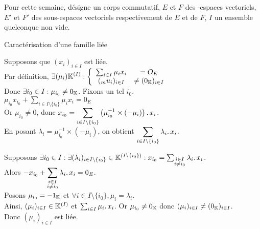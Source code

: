 \documentclass{article}
\date{24 Mars 2024}
\begin{document}
	\maketitle

	Pour cette semaine, \K désigne un corps commutatif, $E$ et $F$ des \K\!\!-espaces vectoriels, $E'$ et $F'$ des sous-espaces vectoriels respectivement de $E$ et de $F$, $I$ un ensemble quelconque non vide.

	\begin{question_kholle}
		[Une famille est liée si et seulement si l'un de ses vecteurs est une combinaison linéaires d'autres vecteurs de la famille.
		\begin{equation}
			(x_i)_{i \in I} \text{ est liée}
			\iff \exists i_0 \in I : \exists (\lambda_i)_{i \in I\setminus\{i_0\}} \in \K^{\left( I \setminus \{i_0\} \right)} :
			x_{i_0} = \sum_{\substack{i \in I \\ i \neq i_0}} \lambda_i \ldotp x_i
		\end{equation}]
		{Caractérisation d'une famille liée}

		Supposons que $(x_i)_{i \in I}$ est liée. \\
		Par définition, $\displaystyle \exists (\mu_i) \mathbb K^{(I)} :
		\left\{ \begin{array}{ccc}
			\sum_{i \in I} \mu_i x_i &= O_E \\
			(_mu_i)_{i \in I} &\neq (0_{\mathbb K})_{i \in I}
		\end{array} \right.$ \\
		Donc $\exists i_0 \in I : \mu_{i_0} \neq 0_{\mathbb K}$. Fixons un tel $i_0$. \\
		$\displaystyle \mu_{i_0} x_{i_0} + \sum_{i \in I \setminus \{i_0\}} \mu_i x_i = 0_E$ \\
		Or $\mu_{i_0} \neq 0$, donc $\displaystyle x_{i_0} = \sum_{i \in I \setminus \{i_0\}} \left( \mu_{i_0}^{-1} \times (-\mu_i) \right) \ldotp x_i$. \\
		En posant $\lambda_i = \mu_{i_0}^{-1} \times (-\mu_i)$, on obtient $\displaystyle \sum_{i \in I \setminus \{i_0\}} \lambda_i \ldotp x_i$.

		Supposons $\exists i_0 \in I : \exists (\lambda_i)_{i \in I\setminus\{i_0\}} \in \mathbb K^{\left( I \setminus \{i_0\} \right)} :
		x_{i_0} = \sum_{\substack{i \in I \\ i \neq i_0}} \lambda_i \ldotp x_i$. \\
		Alors $\displaystyle -x_{i_0} + \sum_{\substack{i \in I \\ i \neq i_0}} \lambda_i \ldotp x_i = 0_E$. \\
		Posons $\mu_{i_0} = - 1_{\mathbb K}$ et $\forall i \in I \!\setminus\! \{i_0\}, \mu_i = \lambda_i$. \\
		Ainsi, $(\mu_i)_{i \in I} \in \mathbb K^{(I)}$ et $\sum_{i \in I} \mu_i \ldotp x_i$. Or $\mu_{i_0} \neq 0_{\mathbb K}$ donc $(\mu_i)_{i \in I} \neq (0_{\mathbb K})_{i \in I}$. \\
		Donc $(\mu_i)_{i \in I}$ est liée.
		

\end{question_kholle}
\end{document}
